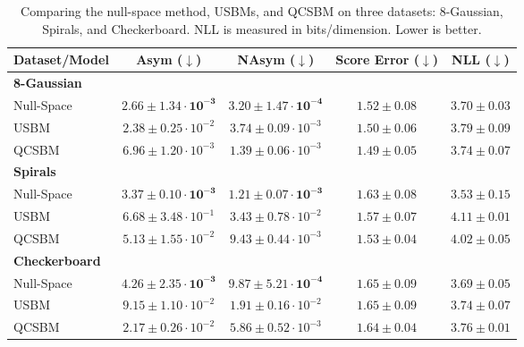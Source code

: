 \begin{table} %
\caption{Comparing the null-space method, USBMs, and QCSBM on three datasets: 8-Gaussian, Spirals, and Checkerboard. NLL is measured in bits/dimension. Lower is better.}
\vspace{-3mm}
\label{tab:conservative_sbm_results}
\begin{center}
\begin{small}
\begin{tabular}{lcccc}
\toprule
 Dataset/Model & Asym ($\downarrow$) & NAsym ($\downarrow$) & Score Error ($\downarrow$) & NLL ($\downarrow$)  \\
\midrule
\textbf{8-Gaussian} \\
Null-Space & $\mathbf{2.66 \pm 1.34 \cdot 10^{-3}}$  & $\mathbf{3.20 \pm 1.47 \cdot 10^{-4}}$  & $1.52 \pm 0.08 $ & $\mathbf{3.70 \pm 0.03} $  \\
USBM &  $2.38\pm0.25 \cdot 10^{-2}$  & $3.74 \pm 0.09 \cdot 10^{-3}$ & $1.50 \pm 0.06$ & $3.79 \pm 0.09 $  \\
QCSBM & $6.96 \pm 1.20 \cdot 10^{-3}$ & $1.39 \pm 0.06 \cdot 10^{-3}$ & $\mathbf{1.49 \pm 0.05} $ &  $3.74 \pm 0.07 $ \\
\midrule
\textbf{Spirals} \\
Null-Space & $\mathbf{3.37 \pm 0.10 \cdot 10^{-3}}$ & $\mathbf{1.21 \pm 0.07 \cdot 10^{-3}}$ & $1.63 \pm 0.08$ & $\mathbf{3.53 \pm 0.15}$  \\
USBM & $6.68 \pm 3.48 \cdot 10^{-1}$ & $ 3.43 \pm 0.78 \cdot 10^{-2}$ & $1.57 \pm 0.07$ & $4.11 \pm 0.01$  \\
QCSBM & $5.13 \pm 1.55 \cdot 10^{-2}$ & $9.43 \pm 0.44 \cdot 10^{-3}$ & $\mathbf{1.53 \pm 0.04 }$ & $4.02 \pm 0.05 $  \\
\midrule
\textbf{Checkerboard} \\
Null-Space & $\mathbf{4.26 \pm 2.35 \cdot 10^{-3}}$  & $\mathbf{9.87 \pm 5.21 \cdot 10^{-4}}$ & $1.65 \pm 0.09 $ & $\mathbf{3.69 \pm 0.05 }$ \\
USBM & $9.15 \pm 1.10 \cdot 10^{-2}$ & $1.91 \pm 0.16 \cdot 10^{-2}$ & $1.65 \pm 0.09$  & $3.74 \pm 0.07$ \\
QCSBM & $2.17 \pm 0.26 \cdot 10^{-2}$ & $5.86 \pm 0.52 \cdot 10^{-3}$ & $\mathbf{1.64 \pm 0.04 }$ & $3.76 \pm 0.01 $ \\
\bottomrule
\end{tabular}
\end{small}
\end{center}
\end{table}

